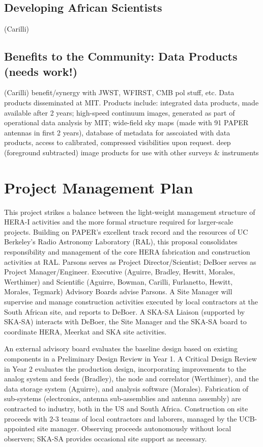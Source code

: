 \documentclass[preprint]{aastex}
\begin{document}
\subsection{Developing African Scientists}

(Carilli)

\subsection{Benefits to the Community: Data Products (needs work!)}

(Carilli) benefit/synergy with JWST, WFIRST, CMB pol stuff, etc.
Data products disseminated at MIT.  Products include:
integrated data products, made available after 2 years;
high-speed continuum images, generated as part of operational data analysis by MIT;
wide-field sky maps (made with 91 PAPER antennas in first 2 years),
database of metadata  for asscoiated with data products,
access to calibrated, compressed visibilities upon request.
deep (foreground subtracted) image products for use with other surveys \& instruments

\section{Project Management Plan}

This project strikes a balance between the light-weight
management structure of HERA-I activities and the more formal structure
required for larger-scale projects.  Building on PAPER's excellent track record
and the resources of UC Berkeley's Radio Astronomy Laboratory (RAL),
this proposal consolidates responsibility and management of the core HERA
fabrication and construction activities at RAL. Parsons serves as
Project Director/Scientist; DeBoer serves as Project Manager/Engineer.
Executive
(Aguirre, Bradley, Hewitt, Morales, Werthimer)
and Scientific (Aguirre, Bowman, Carilli, Furlanetto, Hewitt, Morales, Tegmark) Advisory Boards advise Parsons.
A Site Manager will supervise and manage
construction activities executed by local contractors at the South African
site, and reports to DeBoer.  A SKA-SA Liaison (supported by SKA-SA)
interacts with DeBoer, the Site Manager and the SKA-SA board to
coordinate HERA, Meerkat and SKA site activities.

An external advisory board evaluates the baseline design
based on existing components in a Preliminary Design Review in Year 1.
A Critical Design Review in Year 2 evaluates the
production design, incorporating improvements to the analog system
and feeds (Bradley), the node and correlator (Werthimer), and the data storage
system (Aguirre), and analysis software (Morales).
Fabrication of sub-systems (electronics, antenna sub-assemblies and antenna assembly)
are contracted to industry, both in the US and South Africa.   Construction on site proceeds
with 2-3 teams of local contractors and laborers, managed by the UCB-appointed site manager.  Observing proceeds autonomously without local observers; SKA-SA
provides occasional site support as necessary.
\end{document}
